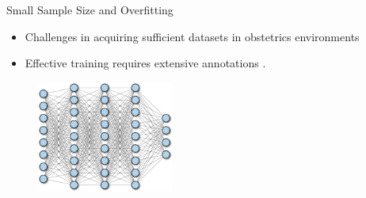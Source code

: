 \documentclass[aspectratio=169]{beamer}
\let\oldcite\cite %
\renewcommand{\cite}[1]{{\tiny\oldcite{#1}}}
\begin{document}




 



\begin{frame}{Small Sample Size and Overfitting}

\begin{itemize}
\setlength\itemsep{1em}
    \item Challenges in acquiring sufficient datasets in obstetrics environments \cite{WOS:000754419000014, willemink2020preparing}
    \item Effective training requires extensive annotations \cite{sarker2021deep, li2021systematic}.
\end{itemize}

\begin{figure}
    \centering
    \includegraphics[width=0.4\textwidth]{overparametrized.png}
\end{figure}

\end{frame}
\end{document}
